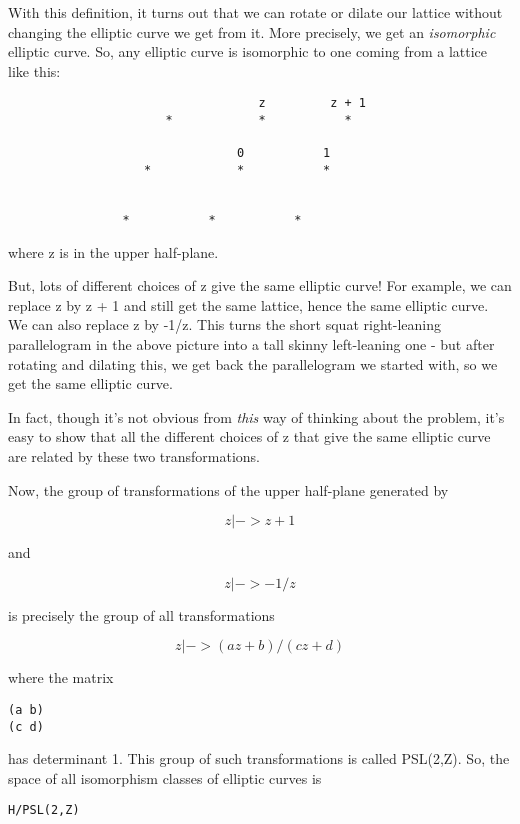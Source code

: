 With this definition, it turns out that we can rotate or dilate
our lattice without changing the elliptic curve we get from it.  
More precisely, we get an \emph{isomorphic} elliptic curve.  So, any 
elliptic curve is isomorphic to one coming from a lattice like this:


\begin{verbatim}
                                   z         z + 1 
                      *            *           *
 
                                0           1
                   *            *           *
               
 
                *           *           *
\end{verbatim}
    
where z is in the upper half-plane.  

But, lots of different choices of z give the same elliptic 
curve!  For example, we can replace z by z + 1 and still get
the same lattice, hence the same elliptic curve.  We can also 
replace z by -1/z.  This turns the short squat right-leaning 
parallelogram in the above picture into a tall skinny left-leaning 
one - but after rotating and dilating this, we get back the 
parallelogram we started with, so we get the same elliptic curve.

In fact, though it's not obvious from \emph{this} way of thinking
about the problem, it's easy to show that all the different 
choices of z that give the same elliptic curve are related by 
these two transformations.

Now, the group of transformations of the upper half-plane 
generated by 

$$
z |-> z + 1
$$
    
and 

$$
z |-> -1/z
$$
    
is precisely the group of all transformations

$$
z |-> (az+b)/(cz+d)
$$
    
where the matrix 

\begin{verbatim}
(a b)
(c d)
\end{verbatim}
    
has determinant 1.  This group of such transformations is
called PSL(2,Z).  So, the space of all isomorphism classes 
of elliptic curves is

\begin{verbatim}
H/PSL(2,Z)
\end{verbatim}
    
